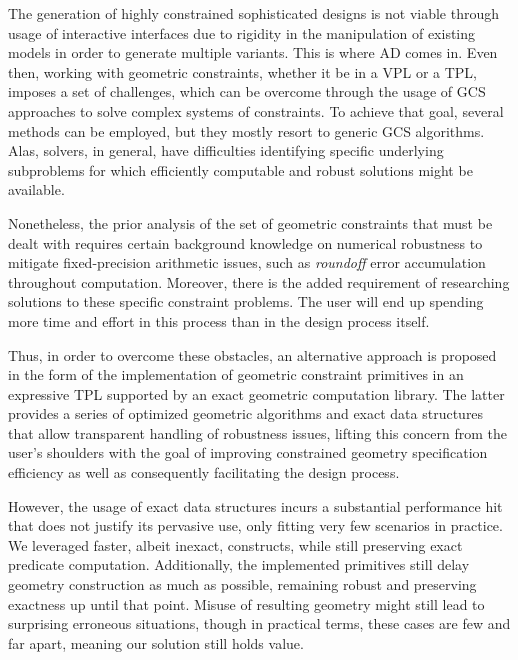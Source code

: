 %
\label{chap:conclusion}
\cleardoublepage{}

\noindent The generation of highly constrained sophisticated designs is not
viable through usage of interactive interfaces due to rigidity in the
manipulation of existing models in order to generate multiple variants.  This is
where \Ac{AD} comes in.  Even then, working with geometric constraints, whether
it be in a \ac{VPL} or a \ac{TPL}, imposes a set of challenges, which can be
overcome through the usage of \ac{GCS} approaches to solve complex systems of
constraints.  To achieve that goal, several methods can be employed, but they
mostly resort to generic \acs{GCS} algorithms.  Alas, solvers, in general, have
difficulties identifying specific underlying subproblems for which efficiently
computable and robust solutions might be available.

Nonetheless, the prior analysis of the set of geometric constraints that must be
dealt with requires certain background knowledge on numerical robustness to
mitigate fixed-precision arithmetic issues, such as \textit{roundoff} error
accumulation throughout computation.  Moreover, there is the added requirement
of researching solutions to these specific constraint problems.  The user will
end up spending more time and effort in this process than in the design process
itself.

Thus, in order to overcome these obstacles, an alternative approach is proposed
in the form of the implementation of geometric constraint primitives in an
expressive \ac{TPL} supported by an exact geometric computation library.  The
latter provides a series of optimized geometric algorithms and exact data
structures that allow transparent handling of robustness issues, lifting this
concern from the user's shoulders with the goal of improving constrained
geometry specification efficiency as well as consequently facilitating the
design process.

However, the usage of exact data structures incurs a substantial performance hit
that does not justify its pervasive use, only fitting very few scenarios in
practice.  We leveraged faster, albeit inexact, constructs, while still
preserving exact predicate computation.  Additionally, the implemented
primitives still delay geometry construction as much as possible, remaining
robust and preserving exactness up until that point.  Misuse of resulting
geometry might still lead to surprising erroneous situations, though in
practical terms, these cases are few and far apart, meaning our solution still
holds value.

